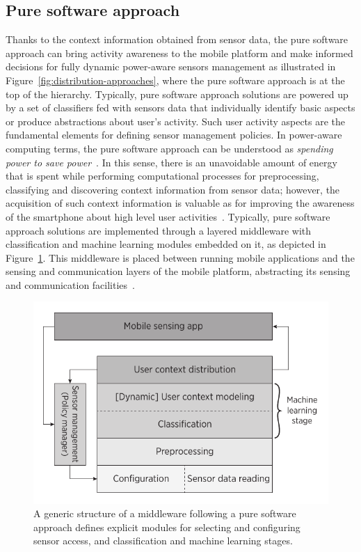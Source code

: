 \documentclass[ENG,PhD]{cinvestav}
\begin{document}
\subsection{Pure software approach}
Thanks to the context information obtained from sensor data, the pure software approach can bring activity awareness to the mobile platform and make informed decisions for fully dynamic power-aware sensors management as illustrated in Figure~\ref{fig:distribution-approaches}, where the pure software approach is at the top of the hierarchy.
Typically, pure software approach solutions are powered up by a set of classifiers fed with sensors data that individually identify basic aspects or produce abstractions about user's activity.
Such user activity aspects are the fundamental elements for defining sensor management policies.
In power-aware computing terms, the pure software approach can be understood as \emph{spending power to save power}~\cite{Ranganathan2010}.
In this sense, there is an unavoidable amount of energy that is spent while performing computational processes for preprocessing, classifying and discovering context information from sensor data; however, the acquisition of such context information is valuable as for improving the awareness of the smartphone about high level user activities~\cite{Yurur2014c}.
Typically, pure software approach solutions are implemented through a layered middleware with classification and machine learning modules embedded on it, as depicted in Figure~\ref{fig:middleware-software-approach}.
This middleware is placed between running mobile applications and the sensing and communication layers of the mobile platform, abstracting its sensing and communication facilities~\cite{Yurur2014}.

\begin{figure}
  \centering
  \includegraphics[width=0.5\columnwidth]{generic-middleware-architecture}
  \caption{A generic structure of a middleware following a pure software approach defines explicit modules for selecting and configuring sensor access, and classification and machine learning stages.}
  \label{fig:middleware-software-approach}
\end{figure}
\end{document}
